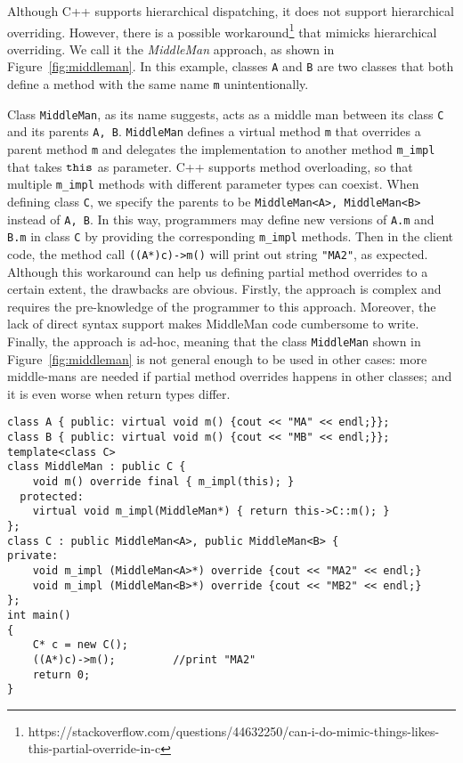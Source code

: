 Although C++ supports hierarchical dispatching, it does not support
hierarchical overriding.  However, there is a possible
workaround\footnote{https://stackoverflow.com/questions/44632250/can-i-do-mimic-things-likes-this-partial-override-in-c} that mimicks hierarchical
overriding.  We call it the \emph{MiddleMan} approach, as shown in
Figure~\ref{fig:middleman}. In this example, classes \texttt{A} and
\texttt{B} are two classes that both define a method with the same
name \texttt{m}
unintentionally.

Class \texttt{MiddleMan}, as its name suggests, acts as a middle man between its class \texttt{C} and its parents \texttt{A, B}. \texttt{MiddleMan} defines a virtual method \texttt{m} that overrides a parent method \texttt{m} and delegates the implementation to another method \texttt{m\_impl} that takes $\texttt{this}$ as parameter. C++ supports method overloading, so that multiple \texttt{m\_impl} methods with different parameter types can coexist. When defining class \texttt{C}, we specify the parents to be \texttt{MiddleMan<A>, MiddleMan<B>} instead of \texttt{A, B}. In this way, programmers may define new versions of \texttt{A.m} and \texttt{B.m} in class \texttt{C} by providing the corresponding \texttt{m\_impl} methods. Then in the client code, the method call \texttt{((A*)c)->m()} will print out string \texttt{"MA2"}, as expected. Although this workaround can help us defining partial method overrides to a certain extent, the drawbacks are obvious. Firstly, the approach is complex and requires the pre-knowledge of the programmer to this approach. Moreover, the lack of direct syntax support makes MiddleMan code cumbersome to write. Finally, the approach is ad-hoc, meaning that the class \texttt{MiddleMan} shown in Figure~\ref{fig:middleman} is not general enough to be used in other cases: more middle-mans are needed if partial method overrides happens in other classes; and it is even worse when return types differ.

\begin{figure*}[t]
\begin{lstlisting}
class A { public: virtual void m() {cout << "MA" << endl;}};
class B { public: virtual void m() {cout << "MB" << endl;}};
template<class C>
class MiddleMan : public C {
    void m() override final { m_impl(this); }
  protected:
    virtual void m_impl(MiddleMan*) { return this->C::m(); }
};
class C : public MiddleMan<A>, public MiddleMan<B> { 
private:
    void m_impl (MiddleMan<A>*) override {cout << "MA2" << endl;}
    void m_impl (MiddleMan<B>*) override {cout << "MB2" << endl;}
};
int main()
{
    C* c = new C();
    ((A*)c)->m();         //print "MA2"
    return 0;
}
\end{lstlisting}
\caption{The \emph{MiddleMan} approach.}
\label{fig:middleman}
\end{figure*}

